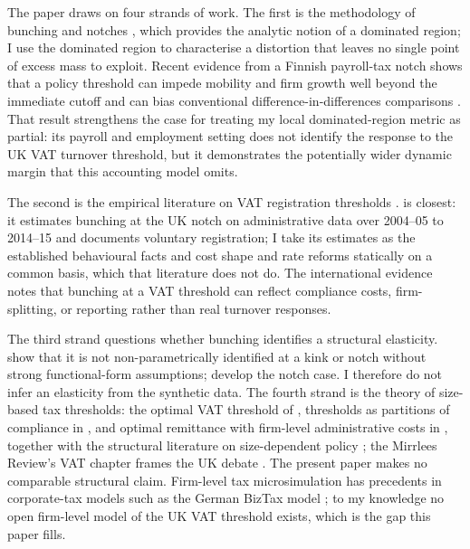 The paper draws on four strands of work. The first is the methodology of bunching and notches \citep{chettyetal2011,saez2010,klevenwaseem2013,kleven2016,best2015}, which provides the analytic notion of a dominated region; I use the dominated region to characterise a distortion that leaves no single point of excess mass to exploit. Recent evidence from a Finnish payroll-tax notch shows that a policy threshold can impede mobility and firm growth well beyond the immediate cutoff and can bias conventional difference-in-differences comparisons \citep{jysmabenzartiharju2026}. That result strengthens the case for treating my local dominated-region metric as partial: its payroll and employment setting does not identify the response to the UK VAT turnover threshold, but it demonstrates the potentially wider dynamic margin that this accounting model omits.

The second is the empirical literature on VAT registration thresholds \citep{liuetal2021,liulockwoodtam2024,onji2009,harju2019,asatryanpeichl2017,nandiwarwick2020,waseem2024}. \citet{liuetal2021} is closest: it estimates bunching at the UK notch on administrative data over 2004--05 to 2014--15 and documents voluntary registration; I take its estimates as the established behavioural facts and cost shape and rate reforms statically on a common basis, which that literature does not do. The international evidence \citep{harju2019,onji2009,asatryanpeichl2017,nandiwarwick2020} notes that bunching at a VAT threshold can reflect compliance costs, firm-splitting, or reporting rather than real turnover responses.

The third strand questions whether bunching identifies a structural elasticity.
\citet{blomquistetal2021} show that it is not non-parametrically identified at a
kink or notch without strong functional-form assumptions; \citet{bertanhaetal2023}
develop the notch case. I therefore do not infer an elasticity from the synthetic
data. The fourth strand is the theory of size-based tax thresholds: the optimal
VAT threshold of \citet{keenmintz2004}, thresholds as partitions of compliance
in \citet{kanburkeen2014}, and optimal remittance with firm-level
administrative costs in \citet{dharmapala2011}, together with the structural
literature on size-dependent policy \citep{garicano2016,gourioroys2014}; the
Mirrlees Review's VAT chapter frames the UK debate \citep{crawfordkeensmith2010}.
The present paper makes no comparable structural claim. Firm-level tax
microsimulation has precedents in corporate-tax models such as the German
BizTax model \citep{fossenbach2008}; to my knowledge no open firm-level model
of the UK VAT threshold exists, which is the gap this paper fills.


